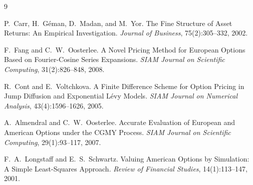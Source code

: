 \documentclass[11pt,a4paper]{article}
\begin{document}

\begin{thebibliography}{9}

P.~Carr, H.~G\'eman, D.~Madan, and M.~Yor.
\newblock The Fine Structure of Asset Returns: An Empirical Investigation.
\newblock \textit{Journal of Business}, 75(2):305--332, 2002.

F.~Fang and C.~W.~Oosterlee.
\newblock A Novel Pricing Method for European Options Based on Fourier-Cosine
  Series Expansions.
\newblock \textit{SIAM Journal on Scientific Computing}, 31(2):826--848, 2008.

R.~Cont and E.~Voltchkova.
\newblock A Finite Difference Scheme for Option Pricing in Jump Diffusion and
  Exponential L\'evy Models.
\newblock \textit{SIAM Journal on Numerical Analysis}, 43(4):1596--1626, 2005.

A.~Almendral and C.~W.~Oosterlee.
\newblock Accurate Evaluation of European and American Options under the
  CGMY Process.
\newblock \textit{SIAM Journal on Scientific Computing}, 29(1):93--117, 2007.

F.~A.~Longstaff and E.~S.~Schwartz.
\newblock Valuing American Options by Simulation: A Simple Least-Squares
  Approach.
\newblock \textit{Review of Financial Studies}, 14(1):113--147, 2001.

\end{thebibliography}
\end{document}
